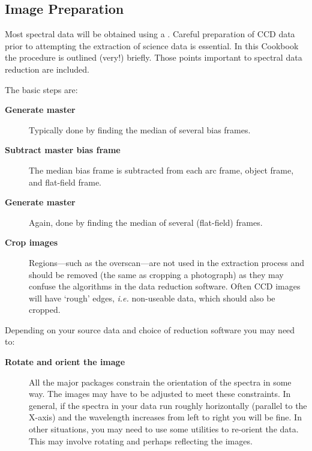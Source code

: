 \documentclass[twoside,11pt]{starlink}
\providecommand{\mlabel}[1]{\xlabel{#1}\label{#1}}
\providecommand{\scspec}[2]{#1}
\begin{document}
\subsection{\mlabel{image_preparation}Image Preparation}

Most spectral data will be obtained using a .
Careful preparation of CCD data prior to attempting the extraction of
science data is essential.
In this Cookbook the procedure is outlined (very!) briefly.
Those points important to spectral data reduction are included.

The basic steps are:

\begin{description}

\item [\textbf{Generate master }]
      Typically done by finding the median of several bias frames.

\item [\textbf{Subtract master bias frame}]
      The median bias frame is subtracted from each arc frame,
      object frame, and flat-field frame.

\item [\textbf{Generate master }]
      Again, done by finding the median of several (flat-field) frames.

\item [\textbf{Crop images}]
      Regions\scspec{---}{ - }such as the overscan\scspec{---}{ - }are
      not used in the extraction process and should be removed (the same
      as cropping a photograph) as they may confuse the algorithms in
      the data reduction software.
      Often CCD images will have `rough' edges, \emph{i.e.} non-useable
      data, which should also be cropped.

\end{description}

Depending on your source data and choice of reduction software you may
need to:

\begin{description}

\item [\textbf{Rotate and orient the image}]
      All the major packages constrain the orientation of the spectra
      in some way.
      The images may have to be adjusted to meet these constraints.
      In general, if the spectra in your data run roughly
      horizontally (parallel to the X-axis) and the wavelength increases
      from left to right you will be fine.
      In other situations, you may need to use some utilities to
      re-orient the data.
      This may involve rotating and perhaps reflecting the images.

\end{description}
\end{document}
